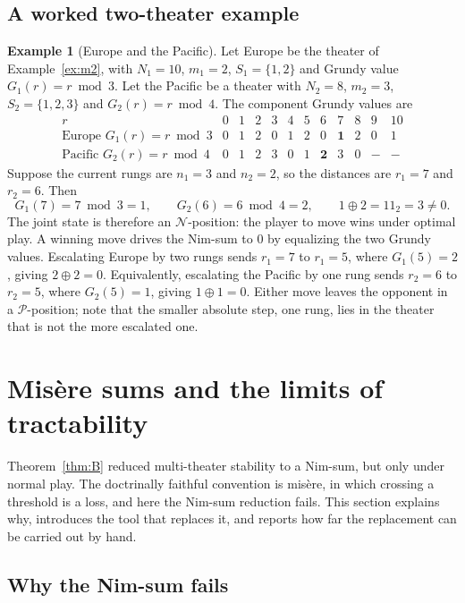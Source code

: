 \documentclass[11pt]{article}
\theoremstyle{plain}
\theoremstyle{definition}
\newtheorem{example}[theorem]{Example}
\theoremstyle{remark}
\begin{document}
\subsection{A worked two-theater example}

\begin{example}[Europe and the Pacific]\label{ex:twotheater}
Let Europe be the theater of Example~\ref{ex:m2}, with $N_1=10$, $m_1=2$,
$S_1=\{1,2\}$ and Grundy value $G_1(r)=r\bmod 3$. Let the Pacific be a
theater with $N_2=8$, $m_2=3$, $S_2=\{1,2,3\}$ and $G_2(r)=r\bmod 4$. The
component Grundy values are
\[
\begin{array}{c|ccccccccccc}
r & 0&1&2&3&4&5&6&7&8&9&10\\\hline
\text{Europe } G_1(r)=r\bmod 3 & 0&1&2&0&1&2&0&\mathbf{1}&2&0&1\\
\text{Pacific } G_2(r)=r\bmod 4 & 0&1&2&3&0&1&\mathbf{2}&3&0&-&-
\end{array}
\]
Suppose the current rungs are $n_1=3$ and $n_2=2$, so the distances are
$r_1=7$ and $r_2=6$. Then
\[
  G_1(7)=7\bmod 3 = 1,\qquad G_2(6)=6\bmod 4 = 2,\qquad
  1\oplus 2 = 11_2 = 3 \neq 0 .
\]
The joint state is therefore an $\mathcal{N}$-position: the player to move
wins under optimal play. A winning move drives the Nim-sum to $0$ by
equalizing the two Grundy values. Escalating Europe by two rungs sends
$r_1=7$ to $r_1=5$, where $G_1(5)=2$, giving $2\oplus 2 = 0$. Equivalently,
escalating the Pacific by one rung sends $r_2=6$ to $r_2=5$, where
$G_2(5)=1$, giving $1\oplus 1 = 0$. Either move leaves the opponent in a
$\mathcal{P}$-position; note that the smaller absolute step, one rung, lies
in the theater that is not the more escalated one.
\end{example}

\section{Mis\`ere sums and the limits of tractability}\label{sec:misere}

Theorem~\ref{thm:B} reduced multi-theater stability to a Nim-sum, but only
under normal play. The doctrinally faithful convention is mis\`ere, in which
crossing a threshold is a loss, and here the Nim-sum reduction fails. This
section explains why, introduces the tool that replaces it, and reports how
far the replacement can be carried out by hand.

\subsection{Why the Nim-sum fails}
\end{document}
